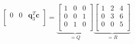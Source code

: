 \begin{mdframed}[style=MyFrame]
\begin{equation}
\begin{bmatrix}
            0                               &   0                               &   \mathbf{q}_{3}^{T}  \mathbf{c}  \\
        \end{bmatrix}
        =
        \underbrace{
            \begin{bmatrix}
                1   &   0   &   0   \\
                0   &   0   &   1   \\
                0   &   1   &   0   \\
            \end{bmatrix}
        }_{=Q}
        \underbrace{
            \begin{bmatrix}
                1   &   2   &   4   \\
                0   &   3   &   6   \\
                0   &   0   &   5   \\
            \end{bmatrix}
        }_{=R}
    \end{equation}
\end{mdframed}
